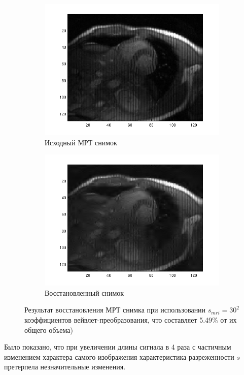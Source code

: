 \documentclass[14pt]{matmex-diploma}
\begin{document}
\begin{figure}[h]
\begin{subfigure}{.5\textwidth}
    \centering
    \includegraphics[width=0.8\linewidth]{pics/coef_rtv_src_img_128.png}
    \caption{Исходный МРТ снимок}
    \label{fig:speedmap_real_src}
\end{subfigure}
\begin{subfigure}{.5\textwidth}
    \centering
    \includegraphics[width=0.8\linewidth]{pics/coef_rtv_result_img_128.png}
    \caption{Восстановленный снимок}
    \label{fig:speedmap_real_dest}
\end{subfigure}

    \caption{Результат восстановления МРТ снимка при использовании $s_{mri}=30^2$ коэффициентов вейвлет-преобразования, что составляет 5.49\% от их общего объема)}
    \label{fig:dwt_result_on_real}
\end{figure}

Было показано, что при увеличении длины сигнала в 4 раза с частичным изменением характера самого изображения характеристика разреженности $s$ претерпела незначительные изменения. 
\end{document}

